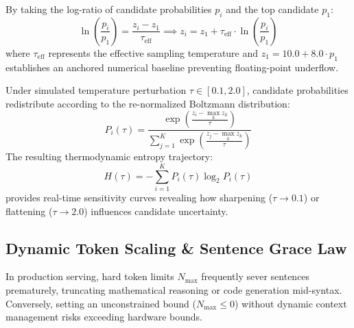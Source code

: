 \documentclass[10pt,twocolumn]{article}
\begin{document}
By taking the log-ratio of candidate probabilities $p_i$ and the top candidate $p_1$:
\begin{equation}
\ln\left(\frac{p_i}{p_1}\right) = \frac{z_i - z_1}{\tau_{\text{eff}}} \implies z_i = z_1 + \tau_{\text{eff}} \cdot \ln\left(\frac{p_i}{p_1}\right)
\end{equation}
where $\tau_{\text{eff}}$ represents the effective sampling temperature and $z_1 = 10.0 + 8.0 \cdot p_1$ establishes an anchored numerical baseline preventing floating-point underflow.

Under simulated temperature perturbation $\tau \in [0.1, 2.0]$, candidate probabilities redistribute according to the re-normalized Boltzmann distribution:
\begin{equation}
P_i(\tau) = \frac{\exp\left(\frac{z_i - \max_k z_k}{\tau}\right)}{\sum_{j=1}^K \exp\left(\frac{z_j - \max_k z_k}{\tau}\right)}
\end{equation}
The resulting thermodynamic entropy trajectory:
\begin{equation}
H(\tau) = -\sum_{i=1}^K P_i(\tau) \log_2 P_i(\tau)
\end{equation}
provides real-time sensitivity curves revealing how sharpening ($\tau \to 0.1$) or flattening ($\tau \to 2.0$) influences candidate uncertainty.

\subsection{Dynamic Token Scaling \& Sentence Grace Law}
In production serving, hard token limits $N_{\text{max}}$ frequently sever sentences prematurely, truncating mathematical reasoning or code generation mid-syntax. Conversely, setting an unconstrained bound ($N_{\text{max}} \le 0$) without dynamic context management risks exceeding hardware bounds.
\end{document}
